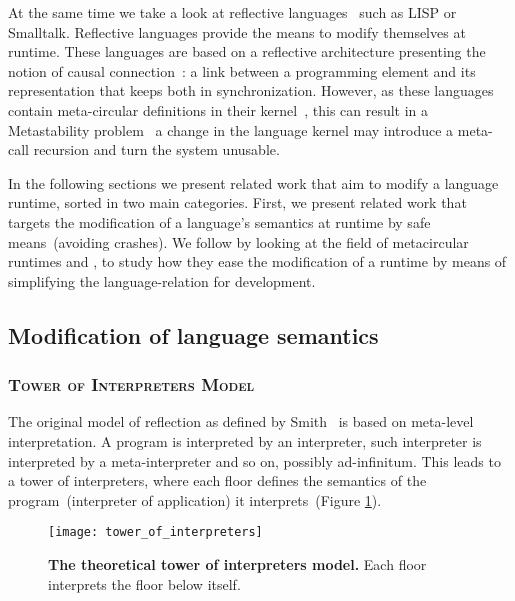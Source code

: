At the same time we take a look at reflective languages~\cite{Smit84a} such as LISP or Smalltalk. Reflective languages provide the means to modify themselves at runtime. These languages are based on a reflective architecture presenting the notion of causal connection~\cite{Maes87a}: a link between a programming element and its representation that keeps both in synchronization. However, as these languages contain meta-circular definitions in their kernel~\cite{Chib96a}, this can result in a Metastability problem~\cite{Kicz91a} \ie a change in the language kernel may introduce a meta-call recursion and turn the system unusable.

In the following sections we present related work that aim to modify a language runtime, sorted in two main categories. First, we present related work that targets the modification of a language's semantics at runtime by safe means~(\ie avoiding crashes). We follow by looking at the field of metacircular runtimes and \VMs, to study how they ease the modification of a runtime by means of simplifying the language-\VM relation for development.

\subsection{Modification of language semantics}

\subsubsection*{\textsc{Tower of Interpreters Model}}

The original model of reflection as defined by Smith~\cite{Smit82c} is based on meta-level interpretation. A program is interpreted by an interpreter, such interpreter is interpreted by a meta-interpreter and so on, possibly ad-infinitum. This leads to a tower of interpreters, where each floor defines the semantics of the program~(interpreter of application) it interprets~(Figure \ref{fig:tower_of_interpreters}).

\begin{figure}[ht]
\begin{center}
\texttt{[image: tower\_of\_interpreters]}
\caption{\textbf{The theoretical tower of interpreters model.} Each floor interprets the floor below itself.\label{fig:tower_of_interpreters}
 }
\end{center}
\end{figure}

